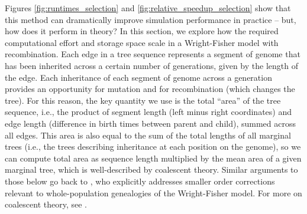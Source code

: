 \documentclass{article}
\begin{document}
Figures \ref{fig:runtimes_selection} and \ref{fig:relative_speedup_selection} show that this method
can dramatically improve simulation performance in practice --
but, how does it perform in theory?
In this section, we explore how the required computational effort and storage space scale
in a Wright-Fisher model with recombination.
Each edge in a tree sequence represents a segment of genome
that has been inherited across a certain number of generations, given by the length of the edge.
Each inheritance of each segment of genome across a generation
provides an opportunity for mutation and for recombination (which changes the tree).
For this reason, the key quantity we use is the total ``area'' of the tree sequence,
i.e., the product of segment length (left minus right coordinates) 
and edge length (difference in birth times between parent and child),
summed across all edges.
This area is also equal to the sum of the total lengths of all marginal trees
(i.e., the trees describing inheritance at each position on the genome),
so we can compute total area as sequence length
multiplied by the mean area of a given marginal tree,
which is well-described by coalescent theory.
Similar arguments to those below go back to \citet{watterson1975number},
who explicitly addresses smaller order corrections relevant to whole-population genealogies
of the Wright-Fisher model.
For more on coalescent theory, see \citet{wakeley2005coalescent}.
\end{document}
